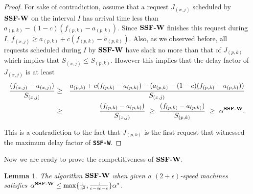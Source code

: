 \documentclass[11pt]{article}
\newtheorem{lemma}{Lemma}[section]
\newcommand{\lemlab}[1]{\label{lemma:#1}}
\newcommand{\eps}{\epsilon}
\newcommand{\st}{S} \newcommand{\Algorithm}[1]{{\texttt{\bf{#1}}}} \newcommand{\sbg}{\Algorithm{SSF-W}} \newcommand{\sug}{\Algorithm{SSF}} \newcommand{\mmug}{\Algorithm{SSF-ID}}
\begin{document}
\begin{proof}
  For sake of contradiction, assume that a request $J_{(x,j)}$
  scheduled by $\sbg$ on the interval $I$ has arrival time less than
  $a_{(p,k)} - (1-c)(f_{(p,k)} - a_{(p,k)})$. Since $\sbg$ finishes
  this request during $I$, $f_{(x,j)} \ge a_{(p,k)} + c(f_{(p,k)} - a_{(p,k)})$.
  Also, as we observed before, all requests scheduled during $I$ by
  $\sbg$ have slack no more than that of $J_{(p,k)}$ which implies
  that $\st_{(x,j)} \le \st_{(p,k)}$. However this implies that
  the delay factor of $J_{(x,j)}$ is at least
    \begin{eqnarray*}
      \frac{(f_{(x,j)} - a_{(x,j)})}{\st_{(x,j)}} & \ge & \frac{a_{(p,k)} + c(f_{(p,k)} - a_{(p,k)}) - (a_{(p,k)} - (1-c)(f_{(p,k)} - a_{(p,k)}))}{\st_{(x,j)}} \\
        & \ge & \frac{(f_{(p,k)} - a_{(p,k)})}{\st_{(x,j)}}
        ~ \ge ~ \frac{(f_{(p,k)} - a_{(p,k)})}{\st_{(p,k)}} ~ \ge ~ \alpha^{\sbg}.
      \end{eqnarray*}

      This is a contradiction to the fact that $J_{(p,k)}$ is the
      first request that witnessed the maximum delay factor of \sbg.
\end{proof}

\medskip

Now we are ready to prove the competitiveness of $\sbg$.

\begin{lemma}
  \lemlab{eps-ceps-c-competitive} The algorithm $\sbg$ when given a
  $(2+\eps)$-speed machines satisfies $\alpha^{\sbg} \le
  \max\{\frac{1}{c^2}, \frac{1}{\eps - c\eps - c}\} \alpha^*$.
\end{lemma}
\end{document}
